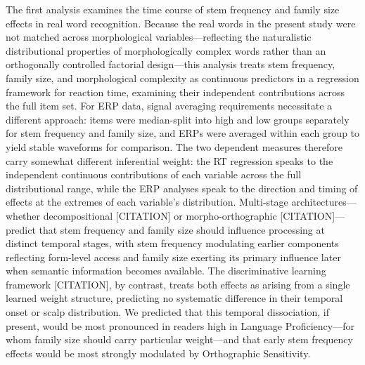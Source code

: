 \documentclass[utf8]{FrontiersinHarvard} %
\begin{document}
The first analysis examines the time course of stem frequency and family size effects in real word recognition. Because the real words in the present study were not matched across morphological variables—reflecting the naturalistic distributional properties of morphologically complex words rather than an orthogonally controlled factorial design—this analysis treats stem frequency, family size, and morphological complexity as continuous predictors in a regression framework for reaction time, examining their independent contributions across the full item set. For ERP data, signal averaging requirements necessitate a different approach: items were median-split into high and low groups separately for stem frequency and family size, and ERPs were averaged within each group to yield stable waveforms for comparison. The two dependent measures therefore carry somewhat different inferential weight: the RT regression speaks to the independent continuous contributions of each variable across the full distributional range, while the ERP analyses speak to the direction and timing of effects at the extremes of each variable's distribution. Multi-stage architectures—whether decompositional [CITATION] or morpho-orthographic [CITATION]—predict that stem frequency and family size should influence processing at distinct temporal stages, with stem frequency modulating earlier components reflecting form-level access and family size exerting its primary influence later when semantic information becomes available. The discriminative learning framework [CITATION], by contrast, treats both effects as arising from a single learned weight structure, predicting no systematic difference in their temporal onset or scalp distribution. We predicted that this temporal dissociation, if present, would be most pronounced in readers high in Language Proficiency—for whom family size should carry particular weight—and that early stem frequency effects would be most strongly modulated by Orthographic Sensitivity.
\end{document}
